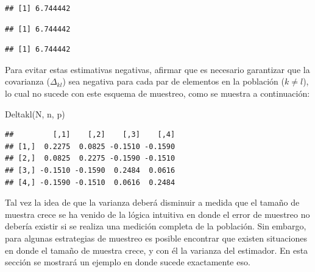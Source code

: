 \documentclass[
  10pt,
  spanish,
]{book}
\newenvironment{Shaded}{\begin{snugshade}}{\end{snugshade}}
\newcommand{\FunctionTok}[1]{\textcolor[rgb]{0.00,0.00,0.00}{#1}}
\newcommand{\NormalTok}[1]{#1}
\newcommand{\SpecialCharTok}[1]{\textcolor[rgb]{0.00,0.00,0.00}{#1}}
\begin{document}
\begin{verbatim}
## [1] 6.744442
\end{verbatim}

\begin{Shaded}
\end{Shaded}

\begin{verbatim}
## [1] 6.744442
\end{verbatim}

\begin{Shaded}
\end{Shaded}

\begin{verbatim}
## [1] 6.744442
\end{verbatim}

Para evitar estas estimativas negativas, \citet{Gutierrez_2016} afirmar que es necesario garantizar que la covarianza (\(\Delta_{kl}\)) sea negativa para cada par de elementos en la población (\(k \neq l\)), lo cual no sucede con este esquema de muestreo, como se muestra a continuación:

\begin{Shaded}
\begin{Highlighting}[]
\FunctionTok{Deltakl}\NormalTok{(N, n, p)}
\end{Highlighting}
\end{Shaded}

\begin{verbatim}
##         [,1]    [,2]    [,3]    [,4]
## [1,]  0.2275  0.0825 -0.1510 -0.1590
## [2,]  0.0825  0.2275 -0.1590 -0.1510
## [3,] -0.1510 -0.1590  0.2484  0.0616
## [4,] -0.1590 -0.1510  0.0616  0.2484
\end{verbatim}

Tal vez la idea de que la varianza deberá disminuir a medida que el tamaño de muestra crece se ha venido de la lógica intuitiva en donde el error de muestreo no debería existir si se realiza una medición completa de la población. Sin embargo, para algunas estrategias de muestreo es posible encontrar que existen situaciones en donde el tamaño de muestra crece, y con él la varianza del estimador. En esta sección se mostrará un ejemplo en donde sucede exactamente eso.
\end{document}
